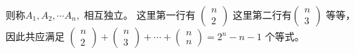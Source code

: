 \begin{enumerate}[1、]
\begin{enumerate}[1)、]
		 	则称$ A_{1}, A_{2}, \cdots A_{n}, $ 相互独立。
		 	这里第一行有 $ \left(\begin{array}{l}
		 	n \\
		 	2
		 	\end{array}\right) $
		 	这里第二行有$ \left(\begin{array}{l}
		 	n \\
		 	3
		 	\end{array}\right) $
		 	等等，因此共应满足 $ \left(\begin{array}{l}
		 	n \\ 2
		 	\end{array}\right)+\left(\begin{array}{l}
		 	n \\ 3
		 	\end{array}\right)+\cdots+\left(\begin{array}{l}
		 	n \\ n
		 	\end{array}\right)=2^{n}-n-1 $ 个等式。
		 \end{enumerate} 
	\end{enumerate}

